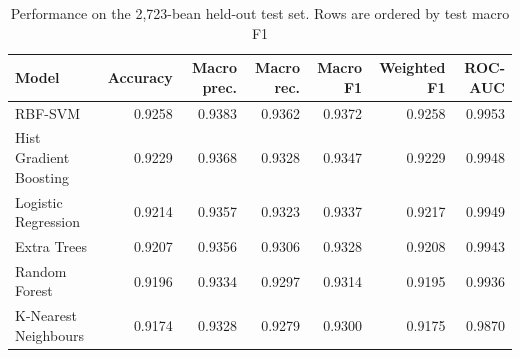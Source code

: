 \begin{table}[htbp]
\centering
\scriptsize
\caption{Performance on the 2,723-bean held-out test set. Rows are ordered by test macro F1}
\label{tab:model_comparison}
\begin{tabular}{lrrrrrr}
\toprule
Model & Accuracy & Macro prec. & Macro rec. & Macro F1 & Weighted F1 & ROC-AUC \\
\midrule
RBF-SVM & 0.9258 & 0.9383 & 0.9362 & 0.9372 & 0.9258 & 0.9953 \\
Hist Gradient Boosting & 0.9229 & 0.9368 & 0.9328 & 0.9347 & 0.9229 & 0.9948 \\
Logistic Regression & 0.9214 & 0.9357 & 0.9323 & 0.9337 & 0.9217 & 0.9949 \\
Extra Trees & 0.9207 & 0.9356 & 0.9306 & 0.9328 & 0.9208 & 0.9943 \\
Random Forest & 0.9196 & 0.9334 & 0.9297 & 0.9314 & 0.9195 & 0.9936 \\
K-Nearest Neighbours & 0.9174 & 0.9328 & 0.9279 & 0.9300 & 0.9175 & 0.9870 \\
\bottomrule
\end{tabular}
\end{table}
